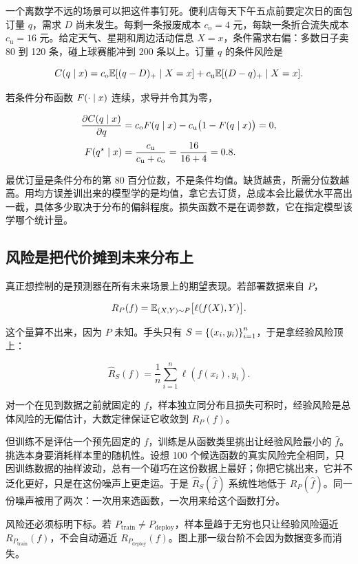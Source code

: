 一个离数学不远的场景可以把这件事钉死。便利店每天下午五点前要定次日的面包订量 \(q\)，需求 \(D\) 尚未发生。每剩一条报废成本 \(c_{\mathrm o}=4\) 元，每缺一条折合流失成本 \(c_{\mathrm u}=16\) 元。给定天气、星期和周边活动信息 \(X=x\)，条件需求右偏：多数日子卖 80 到 120 条，碰上球赛能冲到 200 条以上。订量 \(q\) 的条件风险是

\[
C(q\mid x)=c_{\mathrm o}\mathbb{E}[(q-D)_+\mid X=x]+c_{\mathrm u}\mathbb{E}[(D-q)_+\mid X=x].
\]

若条件分布函数 \(F(\cdot\mid x)\) 连续，求导并令其为零，

\[
\begin{aligned}
\frac{\partial C(q\mid x)}{\partial q}
&=c_{\mathrm o}F(q\mid x)-c_{\mathrm u}\bigl(1-F(q\mid x)\bigr)=0,\\[2pt]
F(q^\star\mid x)&=\frac{c_{\mathrm u}}{c_{\mathrm u}+c_{\mathrm o}}=\frac{16}{16+4}=0.8 .
\end{aligned}
\]

最优订量是条件分布的第 80 百分位数，不是条件均值。缺货越贵，所需分位数越高。用均方误差训出来的模型学的是均值，拿它去订货，总成本会比最优水平高出一截，具体多少取决于分布的偏斜程度。损失函数不是在调参数，它在指定模型该学哪个统计量。

\subsection{风险是把代价摊到未来分布上}

真正想控制的是预测器在所有未来场景上的期望表现。若部署数据来自 \(P\)，

\[
R_P(f)=\mathbb{E}_{(X,Y)\sim P}\bigl[\ell(f(X),Y)\bigr].
\]

这个量算不出来，因为 \(P\) 未知。手头只有 \(S=\left\{(x_i,y_i)\right\}_{i=1}^n\)，于是拿经验风险顶上：

\[
\widehat R_S(f)=\frac1n\sum_{i=1}^n\ell(f(x_i),y_i).
\]

对一个在见到数据之前就固定的 \(f\)，样本独立同分布且损失可积时，经验风险是总体风险的无偏估计，大数定律保证它收敛到 \(R_P(f)\)。

但训练不是评估一个预先固定的 \(f\)，训练是从函数类里挑出让经验风险最小的 \(\widehat f\)。挑选本身要消耗样本里的随机性。设想 100 个候选函数的真实风险完全相同，只因训练数据的抽样波动，总有一个碰巧在这份数据上最好；你把它挑出来，它并不泛化更好，只是在这份噪声上更走运。于是 \(\widehat R_S(\widehat f)\) 系统性地低于 \(R_P(\widehat f)\)。同一份噪声被用了两次：一次用来选函数，一次用来给这个函数打分。

风险还必须标明下标。若 \(P_{\mathrm{train}}\ne P_{\mathrm{deploy}}\)，样本量趋于无穷也只让经验风险逼近 \(R_{P_{\mathrm{train}}}(f)\)，不会自动逼近 \(R_{P_{\mathrm{deploy}}}(f)\)。图上那一级台阶不会因为数据变多而消失。

